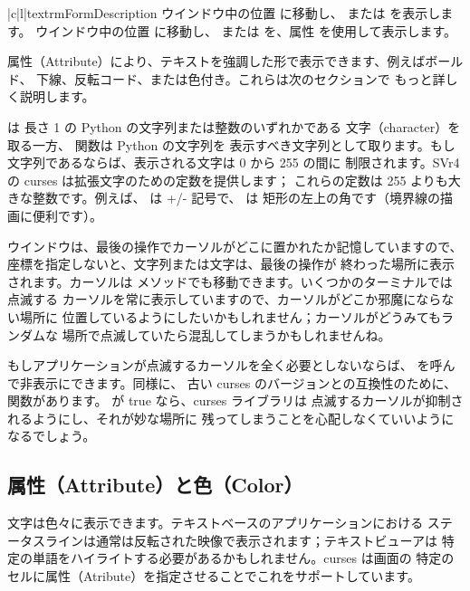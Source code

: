 \documentclass{howto}
\begin{document}
\begin{tableii}{|c|l|}{textrm}{Form}{Description}
{ウインドウ中の位置  に移動し、 
または  を表示します。}
{ウインドウ中の位置  に移動し、
または  を、属性  を使用して表示します。}
\end{tableii}

属性（Attribute）により、テキストを強調した形で表示できます、例えばボールド、
下線、反転コード、または色付き。これらは次のセクションで
もっと詳しく説明します。

 は 長さ 1 の Python の文字列または整数のいずれかである
文字（character）を取る一方、 関数は Python の文字列を
表示すべき文字列として取ります。もし
文字列であるならば、表示される文字は 0 から 255 の間に
制限されます。SVr4 の curses は拡張文字のための定数を提供します；
これらの定数は 255 よりも大きな整数です。例えば、
 は +/- 記号で、 は
矩形の左上の角です（境界線の描画に便利です）。

ウインドウは、最後の操作でカーソルがどこに置かれたか記憶していますので、
 座標を指定しないと、文字列または文字は、最後の操作が
終わった場所に表示されます。カーソルは  
メソッドでも移動できます。いくつかのターミナルでは点滅する
カーソルを常に表示していますので、カーソルがどこか邪魔にならない場所に
位置しているようにしたいかもしれません；カーソルがどうみてもランダムな
場所で点滅していたら混乱してしまうかもしれませんね。

もしアプリケーションが点滅するカーソルを全く必要としないならば、
 を呼んで非表示にできます。同様に、
古い curses のバージョンとの互換性のために、
関数があります。 が true なら、curses ライブラリは
点滅するカーソルが抑制されるようにし、それが妙な場所に
残ってしまうことを心配しなくていいようになるでしょう。

\subsection{属性（Attribute）と色（Color）}

文字は色々に表示できます。テキストベースのアプリケーションにおける
ステータスラインは通常は反転された映像で表示されます；テキストビューアは
特定の単語をハイライトする必要があるかもしれません。curses は画面の
特定のセルに属性（Atribute）を指定させることでこれをサポートしています。
\end{document}
